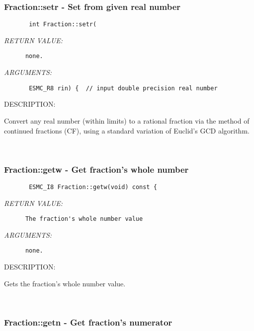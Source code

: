 \subsubsection [Fraction::setr] {Fraction::setr - Set from given real number}


  
\begin{verbatim}       int Fraction::setr(\end{verbatim}{\em RETURN VALUE:}
\begin{verbatim}      none.\end{verbatim}{\em ARGUMENTS:}
\begin{verbatim}       ESMC_R8 rin) {  // input double precision real number\end{verbatim}
{\sf DESCRIPTION:\\ }


       Convert any real number (within limits) to a rational fraction via
       the method of continued fractions (CF), using a standard variation of
       Euclid's GCD algorithm.
   
 
\mbox{}\hrulefill\ 
 
\subsubsection [Fraction::getw] {Fraction::getw - Get fraction's whole number}


  
\begin{verbatim}       ESMC_I8 Fraction::getw(void) const {\end{verbatim}{\em RETURN VALUE:}
\begin{verbatim}      The fraction's whole number value\end{verbatim}{\em ARGUMENTS:}
\begin{verbatim}      none.\end{verbatim}
{\sf DESCRIPTION:\\ }


       Gets the fraction's whole number value.
   
 
\mbox{}\hrulefill\ 
 
\subsubsection [Fraction::getn] {Fraction::getn - Get fraction's numerator}


